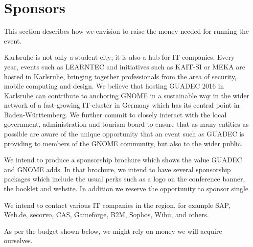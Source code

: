\section{Sponsors}

This section describes how we envision to raise the money needed for running the event.

Karlsruhe is not only a student city; it is also a hub for IT companies. Every year, events such as LEARNTEC and initiatives such as KAIT-SI or MEKA are hosted in Karlsruhe, bringing together professionals from the area of security, mobile computing and design.
We believe that hosting GUADEC 2016 in Karlsruhe can contribute to anchoring GNOME in a sustainable way in the wider network of a fast-growing IT-cluster in Germany which has its central point in Baden-Württemberg.
We further commit to closely interact with the local government, administration and tourism board to ensure that as many entities as possible are aware of the unique opportunity that an event such as GUADEC is providing to members of the GNOME community, but also to the wider public.  

We intend to produce a sponsorship brochure which shows the value GUADEC and GNOME adds.
In that brochure, we intend to have several sponsorship packages which include the usual perks such as a logo on the conference banner, the booklet and website.
In addition we reserve the opportunity to sponsor single 

We intend to contact various IT companies in the region, for example SAP, Web.de, secorvo, 
CAS, Gameforge, B2M, 
Sophos, Wibu,
and others.


As per the budget shown below, we might rely on money we will acquire ourselves.